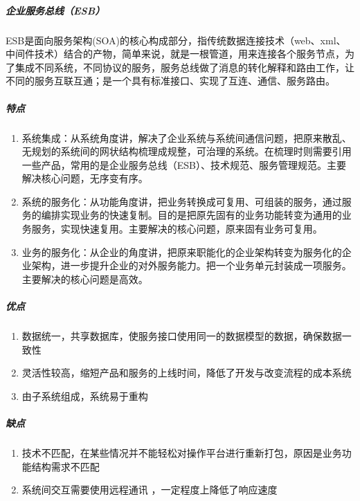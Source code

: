 \documentclass[letterpaper,10pt,english]{sphinxmanual}
\begin{document}
\subparagraph{企业服务总线（ESB）}
\label{\detokenize{chapter_idea/understand_tech:esb}}
ESB是面向服务架构(SOA)的核心构成部分，指传统数据连接技术（web、xml、中间件技术）结合的产物，简单来说，就是一根管道，用来连接各个服务节点，为了集成不同系统，不同协议的服务，服务总线做了消息的转化解释和路由工作，让不同的服务互联互通；是一个具有标准接口、实现了互连、通信、服务路由。


\subparagraph{特点}
\label{\detokenize{chapter_idea/understand_tech:id21}}\begin{enumerate}
%
\item {} 
系统集成：从系统角度讲，解决了企业系统与系统间通信问题，把原来散乱、无规划的系统间的网状结构梳理成规整，可治理的系统。在梳理时则需要引用一些产品，常用的是企业服务总线（ESB）、技术规范、服务管理规范。主要解决核心问题，无序变有序。

\item {} 
系统的服务化：从功能角度讲，把业务转换成可复用、可组装的服务，通过服务的编排实现业务的快速复制。目的是把原先固有的业务功能转变为通用的业务服务，实现快速复用。主要解决的核心问题，原来固有业务可复用。

\item {} 
业务的服务化：从企业的角度讲，把原来职能化的企业架构转变为服务化的企业架构，进一步提升企业的对外服务能力。把一个业务单元封装成一项服务。主要解决的核心问题是高效。

\end{enumerate}


\subparagraph{优点}
\label{\detokenize{chapter_idea/understand_tech:id22}}\begin{enumerate}
%
\item {} 
数据统一，共享数据库，使服务接口使用同一的数据模型的数据，确保数据一致性

\item {} 
灵活性较高，缩短产品和服务的上线时间，降低了开发与改变流程的成本系统

\item {} 
由子系统组成，系统易于重构

\end{enumerate}


\subparagraph{缺点}
\label{\detokenize{chapter_idea/understand_tech:id23}}\begin{enumerate}
%
\item {} 
技术不匹配，在某些情况并不能轻松对操作平台进行重新打包，原因是业务功能结构需求不匹配

\item {} 
系统间交互需要使用远程通讯 ，一定程度上降低了响应速度

\end{enumerate}
\end{document}
